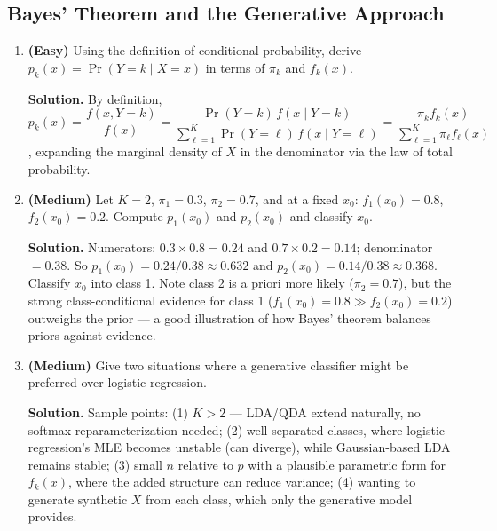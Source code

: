 \documentclass[11pt]{article}
\begin{document}
\subsection{Bayes' Theorem and the Generative Approach}
\begin{enumerate}
\item \textbf{(Easy)} Using the definition of conditional probability, derive $p_k(x)=\Pr(Y=k\mid X=x)$ in terms of $\pi_k$ and $f_k(x)$.

\textbf{Solution.} By definition, $p_k(x) = \dfrac{f(x,Y=k)}{f(x)} = \dfrac{\Pr(Y=k)\,f(x\mid Y=k)}{\sum_{\ell=1}^K \Pr(Y=\ell)\,f(x\mid Y=\ell)} = \dfrac{\pi_k f_k(x)}{\sum_{\ell=1}^K \pi_\ell f_\ell(x)}$, expanding the marginal density of $X$ in the denominator via the law of total probability.

\item \textbf{(Medium)} Let $K=2$, $\pi_1=0.3$, $\pi_2=0.7$, and at a fixed $x_0$: $f_1(x_0)=0.8$, $f_2(x_0)=0.2$. Compute $p_1(x_0)$ and $p_2(x_0)$ and classify $x_0$.

\textbf{Solution.} Numerators: $0.3\times0.8=0.24$ and $0.7\times0.2=0.14$; denominator $=0.38$. So $p_1(x_0)=0.24/0.38\approx0.632$ and $p_2(x_0)=0.14/0.38\approx0.368$. Classify $x_0$ into class 1. Note class 2 is a priori more likely ($\pi_2=0.7$), but the strong class-conditional evidence for class 1 ($f_1(x_0)=0.8 \gg f_2(x_0)=0.2$) outweighs the prior --- a good illustration of how Bayes' theorem balances priors against evidence.

\item \textbf{(Medium)} Give two situations where a generative classifier might be preferred over logistic regression.

\textbf{Solution.} Sample points: (1) $K>2$ --- LDA/QDA extend naturally, no softmax reparameterization needed; (2) well-separated classes, where logistic regression's MLE becomes unstable (can diverge), while Gaussian-based LDA remains stable; (3) small $n$ relative to $p$ with a plausible parametric form for $f_k(x)$, where the added structure can reduce variance; (4) wanting to generate synthetic $X$ from each class, which only the generative model provides.
\end{enumerate}
\end{document}
